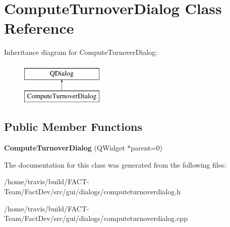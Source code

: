 \hypertarget{classComputeTurnoverDialog}{\section{Compute\-Turnover\-Dialog Class Reference}
\label{classComputeTurnoverDialog}
}
Inheritance diagram for Compute\-Turnover\-Dialog\-:\begin{figure}[H]
\begin{center}
\leavevmode
\includegraphics[height=2.000000cm]{d5/d7b/classComputeTurnoverDialog}
\end{center}
\end{figure}
\subsection*{Public Member Functions}
\begin{DoxyCompactItemize}
\item 
\hypertarget{classComputeTurnoverDialog_a080bc7caeddd44b4ad5973502ca4d265}{{\bfseries Compute\-Turnover\-Dialog} (Q\-Widget $\ast$parent=0)}\label{classComputeTurnoverDialog_a080bc7caeddd44b4ad5973502ca4d265}

\end{DoxyCompactItemize}


The documentation for this class was generated from the following files\-:\begin{DoxyCompactItemize}
\item 
/home/travis/build/\-F\-A\-C\-T-\/\-Team/\-Fact\-Dev/src/gui/dialogs/computeturnoverdialog.\-h\item 
/home/travis/build/\-F\-A\-C\-T-\/\-Team/\-Fact\-Dev/src/gui/dialogs/computeturnoverdialog.\-cpp\end{DoxyCompactItemize}
